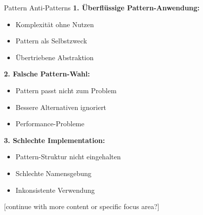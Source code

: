 \begin{KR}{Pattern Anti-Patterns}
\textbf{1. Überflüssige Pattern-Anwendung:}
\begin{itemize}
   \item Komplexität ohne Nutzen
   \item Pattern als Selbstzweck
   \item Übertriebene Abstraktion
\end{itemize}

\textbf{2. Falsche Pattern-Wahl:}
\begin{itemize}
   \item Pattern passt nicht zum Problem
   \item Bessere Alternativen ignoriert
   \item Performance-Probleme
\end{itemize}

\textbf{3. Schlechte Implementation:}
\begin{itemize}
   \item Pattern-Struktur nicht eingehalten
   \item Schlechte Namensgebung
   \item Inkonsistente Verwendung
\end{itemize}
\end{KR}

[continue with more content or specific focus area?]

